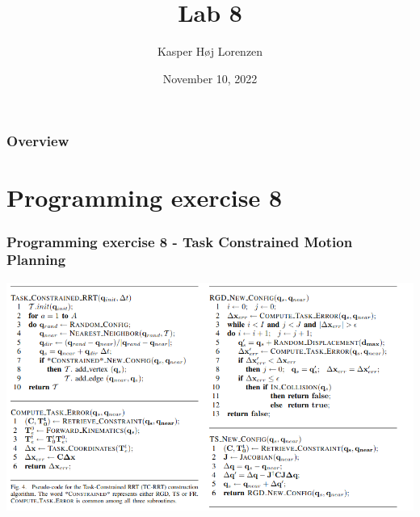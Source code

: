 \documentclass{beamer}
\title[Lab 8]{Lab 8} %
\author{Kasper Høj Lorenzen} %
\institute[SDU Robotics] %
{
University of Southern Denmark \\ %
\medskip
\textit{kalor@mmmi.sdu.dk} %
}
\date{November 10, 2022} %
\begin{document}
\begin{frame}
\titlepage %
\end{frame}

\begin{frame}
\frametitle{Overview} %
\tableofcontents %
\end{frame}


\section{Programming exercise 8}

\begin{frame}
 \frametitle{Programming exercise 8 - Task Constrained Motion Planning}
	\begin{center}
        \includegraphics[width=\textwidth]{./rrt_constrain}
      \end{center}
\end{frame}
\end{document}
